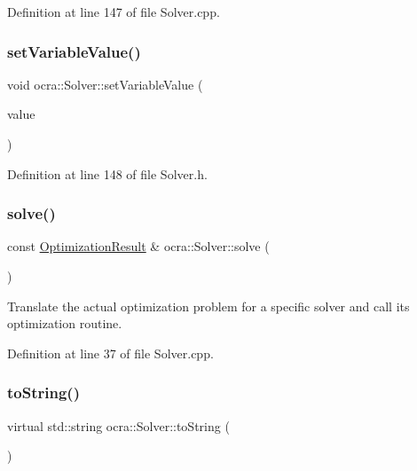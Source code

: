 Definition at line 147 of file Solver.\+cpp.

\hypertarget{classocra_1_1Solver_ac67fe8faaf3355f3430b5fed881832fe}{}\label{classocra_1_1Solver_ac67fe8faaf3355f3430b5fed881832fe} 
\subsubsection{\texorpdfstring{set\+Variable\+Value()}{setVariableValue()}}
{\footnotesize\ttfamily void ocra\+::\+Solver\+::set\+Variable\+Value (\begin{DoxyParamCaption}\item[{const Vector\+Xd \&}]{value }\end{DoxyParamCaption})\hspace{0.3cm}{\ttfamily [inline]}}



Definition at line 148 of file Solver.\+h.

\hypertarget{classocra_1_1Solver_a86151fea09399da16d6ce47abb1ba904}{}\label{classocra_1_1Solver_a86151fea09399da16d6ce47abb1ba904} 
\subsubsection{\texorpdfstring{solve()}{solve()}}
{\footnotesize\ttfamily const \hyperlink{structocra_1_1OptimizationResult}{Optimization\+Result} \& ocra\+::\+Solver\+::solve (\begin{DoxyParamCaption}{ }\end{DoxyParamCaption})}

Translate the actual optimization problem for a specific solver and call its optimization routine. 

Definition at line 37 of file Solver.\+cpp.

\hypertarget{classocra_1_1Solver_ab3783d1c208500bfb1daa3e1abf34146}{}\label{classocra_1_1Solver_ab3783d1c208500bfb1daa3e1abf34146} 
\subsubsection{\texorpdfstring{to\+String()}{toString()}}
{\footnotesize\ttfamily virtual std\+::string ocra\+::\+Solver\+::to\+String (\begin{DoxyParamCaption}{ }\end{DoxyParamCaption})\hspace{0.3cm}{\ttfamily [pure virtual]}}

